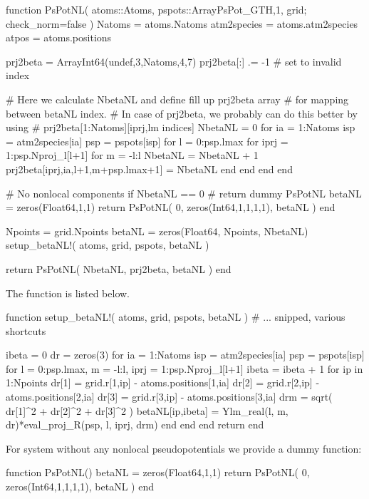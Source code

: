 \begin{juliacode}
function PsPotNL( atoms::Atoms, pspots::Array{PsPot_GTH,1}, grid; check_norm=false )
  Natoms = atoms.Natoms
  atm2species = atoms.atm2species
  atpos = atoms.positions

  prj2beta = Array{Int64}(undef,3,Natoms,4,7)
  prj2beta[:] .= -1   # set to invalid index

  # Here we calculate NbetaNL and define fill up prj2beta array
  # for mapping between betaNL index.
  # In case of prj2beta, we probably can do this better by using
  # prj2beta[1:Natoms][iprj,lm indices]
  NbetaNL = 0
  for ia = 1:Natoms
    isp = atm2species[ia]
    psp = pspots[isp]
    for l = 0:psp.lmax
      for iprj = 1:psp.Nproj_l[l+1]
        for m = -l:l
          NbetaNL = NbetaNL + 1
          prj2beta[iprj,ia,l+1,m+psp.lmax+1] = NbetaNL
        end
      end
    end
  end

  # No nonlocal components
  if NbetaNL == 0
    # return dummy PsPotNL
    betaNL = zeros(Float64,1,1)
    return PsPotNL( 0, zeros(Int64,1,1,1,1), betaNL )
  end

  Npoints = grid.Npoints
  betaNL = zeros(Float64, Npoints, NbetaNL)
  setup_betaNL!( atoms, grid, pspots, betaNL )

  return PsPotNL( NbetaNL, prj2beta, betaNL )
end
\end{juliacode}

The function  is listed below.
\begin{juliacode}
function setup_betaNL!( atoms, grid, pspots, betaNL )
  # ... snipped, various shortcuts

  ibeta = 0
  dr = zeros(3)
  for ia = 1:Natoms
    isp = atm2species[ia]
    psp = pspots[isp]
    for l = 0:psp.lmax, m = -l:l, iprj = 1:psp.Nproj_l[l+1]
      ibeta = ibeta + 1
      for ip in 1:Npoints
        dr[1] = grid.r[1,ip] - atoms.positions[1,ia]
        dr[2] = grid.r[2,ip] - atoms.positions[2,ia]
        dr[3] = grid.r[3,ip] - atoms.positions[3,ia]
        drm = sqrt( dr[1]^2 + dr[2]^2 + dr[3]^2 )
        betaNL[ip,ibeta] = Ylm_real(l, m, dr)*eval_proj_R(psp, l, iprj, drm)
      end
    end
  end
  return
end
\end{juliacode}

For system without any nonlocal pseudopotentials we provide a dummy function:
\begin{juliacode}
function PsPotNL()
  betaNL = zeros(Float64,1,1)
  return PsPotNL( 0, zeros(Int64,1,1,1,1), betaNL )
end
\end{juliacode}

